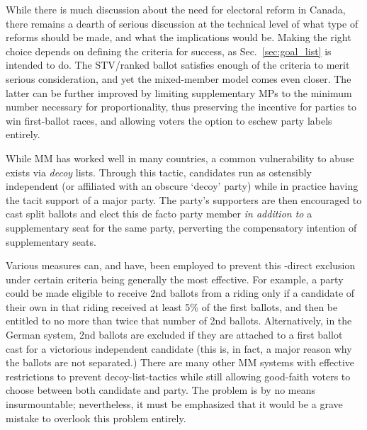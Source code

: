 \documentclass[DIV=calc, paper=a4, fontsize=11pt, twocolumn]{scrartcl}	 %
\begin{document}
While there is much discussion about the need for electoral reform in Canada, there remains a dearth of serious discussion at the technical level of what type of reforms should be made, and what the implications would be. 
Making the right choice depends on defining the criteria for success, as Sec.~\ref{sec:goal_list} is intended to do.  
The STV/ranked ballot satisfies enough of the criteria to merit serious consideration, and yet the mixed-member model comes even closer. 
The latter can be further improved by limiting supplementary MPs to the minimum number necessary for proportionality, thus preserving the incentive for parties to win first-ballot races, and allowing voters the option to eschew party labels entirely.

%
While MM has worked well in many countries, a common vulnerability to abuse exists via \emph{decoy} lists. 
Through this tactic, candidates run as ostensibly independent (or affiliated with an obscure `decoy' party) while in practice having the tacit support of a major party.
The party's supporters are then encouraged to cast split ballots and elect this de facto party member \emph{in addition to} a supplementary seat for the same party, perverting the compensatory intention of supplementary seats.

Various measures can, and have, been employed to prevent this \--direct exclusion under certain criteria being generally the most effective.
For example, a party could be made eligible to receive 2nd ballots from a riding only if a candidate of their own in that riding received at least 5\% of the first ballots, and then be entitled to no more than twice that number of 2nd ballots. 
Alternatively, in the German system, 2nd ballots are excluded if they are attached to a first ballot cast for a victorious independent candidate (this is, in fact, a major reason why the ballots are not separated.) 
There are many other MM systems with effective restrictions to prevent decoy-list-tactics while still allowing good-faith voters to choose between both candidate and party. The problem is by no means insurmountable; nevertheless, it must be emphasized that it would be a grave mistake to overlook this problem entirely.
\end{document}

